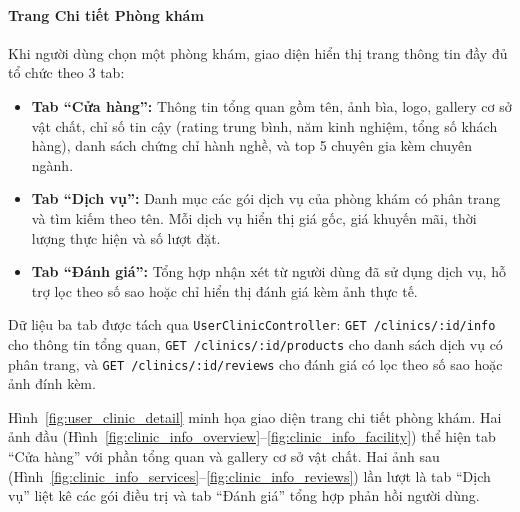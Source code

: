 \paragraph{Trang Chi tiết Phòng khám}

Khi người dùng chọn một phòng khám, giao diện hiển thị trang thông tin đầy đủ tổ chức theo 3 tab:

\begin{itemize}
    \item \textbf{Tab ``Cửa hàng'':} Thông tin tổng quan gồm tên, ảnh bìa, logo, gallery cơ sở vật chất, chỉ số tin cậy (rating trung bình, năm kinh nghiệm, tổng số khách hàng), danh sách chứng chỉ hành nghề, và top 5 chuyên gia kèm chuyên ngành.

    \item \textbf{Tab ``Dịch vụ'':} Danh mục các gói dịch vụ của phòng khám có phân trang và tìm kiếm theo tên. Mỗi dịch vụ hiển thị giá gốc, giá khuyến mãi, thời lượng thực hiện và số lượt đặt.

    \item \textbf{Tab ``Đánh giá'':} Tổng hợp nhận xét từ người dùng đã sử dụng dịch vụ, hỗ trợ lọc theo số sao hoặc chỉ hiển thị đánh giá kèm ảnh thực tế.
\end{itemize}

Dữ liệu ba tab được tách qua \texttt{UserClinicController}: \texttt{GET /clinics/:id/info} cho thông tin tổng quan, \texttt{GET /clinics/:id/products} cho danh sách dịch vụ có phân trang, và \texttt{GET /clinics/:id/reviews} cho đánh giá có lọc theo số sao hoặc ảnh đính kèm.

Hình~\ref{fig:user_clinic_detail} minh họa giao diện trang chi tiết phòng khám. Hai ảnh đầu (Hình~\ref{fig:clinic_info_overview}--\ref{fig:clinic_info_facility}) thể hiện tab ``Cửa hàng'' với phần tổng quan và gallery cơ sở vật chất. Hai ảnh sau (Hình~\ref{fig:clinic_info_services}--\ref{fig:clinic_info_reviews}) lần lượt là tab ``Dịch vụ'' liệt kê các gói điều trị và tab ``Đánh giá'' tổng hợp phản hồi người dùng.

